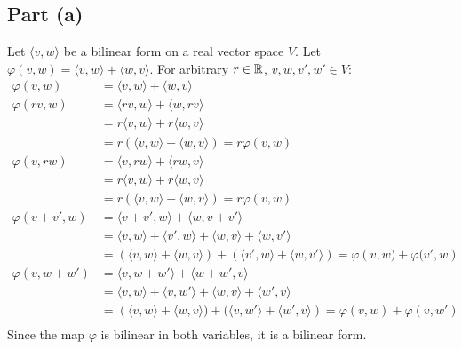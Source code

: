 \documentclass{article}
\begin{document}
\subsection*{Part (a)}
Let $\langle v, w\rangle$ be a bilinear form on a real vector space $V$. Let $\varphi\left(v,  w\right) = \langle v, w \rangle + \langle w, v \rangle$. For arbitrary $r \in \mathbb{R}$, $v, w, v', w' \in V$:
\begin{equation}
    \begin{split}
        \varphi\left(v, w\right) & = \langle v, w \rangle + \langle w, v \rangle \\
        \varphi\left(rv, w\right) & = \langle rv, w \rangle + \langle w, rv \rangle \\
        & = r\langle v, w \rangle + r\langle w, v \rangle \\
        & = r\left(\langle  v, w \rangle + \langle w, v  \rangle\right) = r\varphi\left(v, w\right) \\
        \varphi\left(v, rw\right) & = \langle v, rw \rangle + \langle rw, v \rangle \\
        & = r\langle v, w \rangle + r\langle w, v \rangle \\
        & = r\left(\langle  v, w \rangle + \langle w, v  \rangle\right) = r\varphi\left(v, w\right) \\
        \varphi\left(v + v', w\right) & = \langle v + v', w \rangle + \langle w, v + v' \rangle \\
        & = \langle v, w \rangle + \langle v', w \rangle + \langle w, v \rangle + \langle w, v' \rangle \\
        & = \left(\langle  v, w \rangle + \langle w, v \rangle\right) + \left(\langle v', w \rangle + \langle w, v'  \rangle\right) = \varphi\left(v,  w) + \varphi(v', w\right) \\
        \varphi\left(v, w + w'\right) & = \langle v, w + w' \rangle + \langle w + w', v \rangle \\
        & = \langle v, w \rangle + \langle v, w' \rangle + \langle w, v \rangle + \langle w', v \rangle \\
        & = \left(\langle  v, w \rangle + \langle w, v \rangle) + (\langle v, w' \rangle + \langle w', v  \rangle\right) = \varphi\left(v,  w\right) + \varphi\left(v, w'\right) \\
    \end{split}
\end{equation}
Since the map $\varphi$ is bilinear in both variables, it is a bilinear form.
\end{document}
